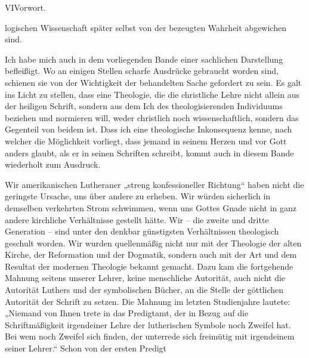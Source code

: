 VI\hfill Vorwort.

logischen Wissenschaft später selbst von der bezeugten Wahrheit abgewichen sind.

Ich habe mich auch in dem vorliegenden Bande einer sachlichen Darstellung befleißigt. Wo an einigen Stellen scharfe Ausdrücke gebraucht worden sind, schienen sie von der Wichtigkeit der behandelten Sache gefordert zu sein. Es galt ins Licht zu stellen, dass eine Theologie, die die christliche Lehre nicht allein aus der heiligen Schrift, sondern aus dem Ich des theologisierenden Individuums beziehen und normieren will, weder christlich noch wissenschaftlich, sondern das Gegenteil von beidem ist. Dass ich eine theologische Inkonsequenz kenne, nach welcher die Möglichkeit vorliegt, dass jemand in seinem Herzen und vor Gott anders glaubt, als er in seinen Schriften schreibt, kommt auch in diesem Bande wiederholt zum Ausdruck.

Wir amerikanischen Lutheraner „streng konfessioneller Richtung“ haben nicht die geringste Ursache, uns über andere zu erheben. Wir würden sicherlich in demselben verkehrten Strom schwimmen, wenn uns Gottes Gnade nicht in ganz andere kirchliche Verhältnisse gestellt hätte. Wir – die zweite und dritte Generation – sind unter den denkbar günstigsten Verhältnissen theologisch geschult worden. Wir wurden quellenmäßig nicht nur mit der Theologie der alten Kirche, der Reformation und der Dogmatik, sondern auch mit der Art und dem Resultat der modernen Theologie bekannt gemacht. Dazu kam die fortgehende Mahnung seitens unserer Lehrer, keine menschliche Autorität, auch nicht die Autorität Luthers und der symbolischen Bücher, an die Stelle der göttlichen Autorität der Schrift zu setzen. Die Mahnung im letzten Studienjahre lautete: „Niemand von Ihnen trete in das Predigtamt, der in Bezug auf die Schriftmäßigkeit irgendeiner Lehre der lutherischen Symbole noch Zweifel hat. Bei wem noch Zweifel sich finden, der unterrede sich freimütig mit irgendeinem seiner Lehrer.“ Schon von der ersten Predigt